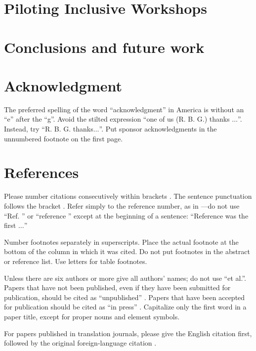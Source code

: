 \documentclass[conference]{IEEEtran}
\begin{document}
\section{Piloting Inclusive Workshops}
\lipsum[1]

\section{Conclusions and future work}
\lipsum[1]


\section*{Acknowledgment}

The preferred spelling of the word ``acknowledgment'' in America is without 
an ``e'' after the ``g''. Avoid the stilted expression ``one of us (R. B. 
G.) thanks $\ldots$''. Instead, try ``R. B. G. thanks$\ldots$''. Put sponsor 
acknowledgments in the unnumbered footnote on the first page.

\section*{References}

Please number citations consecutively within brackets \cite{pearce2013open}. The 
sentence punctuation follows the bracket \cite{tarik2017}. Refer simply to the reference 
number, as in \cite{UNICEF2020}---do not use ``Ref. \cite{hu2018}'' or ``reference \cite{hu2018}'' except at 
the beginning of a sentence: ``Reference \cite{hu2018} was the first $\ldots$''

Number footnotes separately in superscripts. Place the actual footnote at 
the bottom of the column in which it was cited. Do not put footnotes in the 
abstract or reference list. Use letters for table footnotes.

Unless there are six authors or more give all authors' names; do not use 
``et al.''. Papers that have not been published, even if they have been 
submitted for publication, should be cited as ``unpublished'' \cite{opensource2021}. Papers 
that have been accepted for publication should be cited as ``in press'' \cite{opensource2021}. 
Capitalize only the first word in a paper title, except for proper nouns and 
element symbols.

For papers published in translation journals, please give the English 
citation first, followed by the original foreign-language citation \cite{Serholt:2017}.



\end{document}
